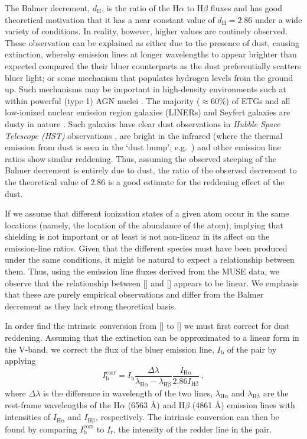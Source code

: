 		The Balmer decrement, $d_\mathrm{H}$, is the ratio of the H$\alpha$ to H$\beta$ fluxes and has good theoretical motivation that it has a near constant value of $d_\mathrm{H} = 2.86$ under a wide variety of conditions. In reality, however, higher values are routinely observed. These observation can be explained as either due to the presence of dust, causing extinction, whereby emission lines at longer wavelengths to appear brighter than expected compared the their bluer counterparts as the dust preferentially scatters bluer light; or some mechanism that populates hydrogen levels from the ground up. Such mechanisms may be important in high-density environments such at within powerful (type 1) AGN nuclei \citep[e.g.][]{Shields1974, Netzer1975}. The majority ($\approx 60$\%) of ETGs and all low-ionized nuclear emission region galaxies (LINERs) and Seyfert galaxies are dusty in nature \citep[e.g.][]{Martini2013}. Such galaxies have clear dust observations in \textit{Hubble Space Telescope (HST)} observations \citep[e.g.][]{Martini2013}, are bright in the infrared (where the thermal emission from dust is seen in the `dust bump'; e.g.\ \citealt{Jura1987, Knapp1992}) and other emission line ratios \citep[e.g.\  in ][]{Wampler1968} show similar reddening. Thus, assuming the observed steeping of the Balmer decrement is entirely due to dust, the ratio of the observed decrement to the theoretical value of 2.86 is a good estimate for the reddening effect of the dust.

		If we assume that different ionization states of a given atom occur in the same locations (namely, the location of the abundance of the atom), implying that shielding is not important or at least is not non-linear in its affect on the emission-line ratios. Given that the different species must have been produced under the same conditions, it might be natural to expect a relationship between them. Thus, using the emission line fluxes derived from the MUSE data, we observe that the relationship between [] and [] appears to be linear. We emphasis that these are purely empirical observations and differ from the Balmer decrement as they lack strong theoretical basis. 

		In order find the intrinsic conversion from [] to [] we must first correct for dust reddening. Assuming that the extinction can be approximated to a linear form in the V-band, we correct the flux of the bluer emission line, $I_\mathrm{b}$ of the pair by applying
		\begin{equation}
			I^\mathrm{corr}_\mathrm{b} = I_\mathrm{b} \frac{\Delta\lambda}{\lambda_\mathrm{H\alpha} - \lambda_\mathrm{H\beta}} \frac{I_\mathrm{H\alpha}}{2.86 I_\mathrm{H\beta}} \, ,
		\end{equation}
		where $\Delta\lambda$ is the difference in wavelength of the two lines, $\lambda_\mathrm{H\alpha}$ and $\lambda_\mathrm{H\beta}$ are the rest-frame wavelengths of the H$\alpha$ (6563 \AA) and H$\beta$ (4861 \AA) emission lines with intensities of $I_\mathrm{H\alpha}$ and $I_\mathrm{H\beta}$, respectively. The intrinsic conversion can then be found by comparing $I^\mathrm{corr}_\mathrm{b}$ to $I_\mathrm{r}$, the intensity of the redder line in the pair. 

